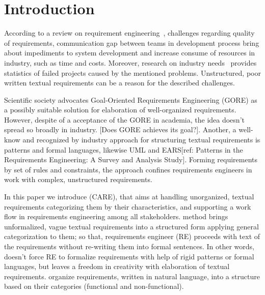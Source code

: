 \section{Introduction}
\label{sec:intro} 


According to a review on requirement engineering~\cite{1Review}, challenges regarding quality of requirements, communication gap between teams in development process bring about impediments to system development and increase consume of resources in industry, such as time and costs. Moreover, research on industry needs~\cite{16NaPiRe} provides statistics of failed projects caused by the mentioned problems. Unstructured, poor written textual requirements can be a reason for the described challenges.

Scientific society advocates Goal-Oriented Requirements Engineering (GORE) as a possibly suitable solution for elaboration of well-organized requirements. However, despite of a acceptance of the GORE in academia, the idea doesn't spread so broadly in industry. [Does GORE achieves its goal?]. Another, a well-know and recognized by industry approach for structuring textual requirements is patterns and formal languages, likewise UML and EARS[ref: Patterns in the Requirements Engineering: A Survey and Analysis Study]. Forming requirements by set of rules and constraints, the approach confines requirements engineers in work with complex, unstructured requirements.

In this paper we introduce \care (CARE), that aims at handling unorganized, textual requirements categorizing them by their characteristics, and supporting a work flow in requirements engineering among all stakeholders. \ca method brings unformalized, vague textual requirements into 
a structured form applying general categorization to them; so that, requirements engineer (RE) 
proceeds with text of the requirements without re-writing them into formal sentences. 
In other words, \ca doesn't force RE to formalize requirements with help of rigid patterns or 
formal languages, but leaves a freedom in creativity with elaboration of textual requirements. 
\ca organize requirements, written in natural language, into a structure based on their categories 
(functional and non-functional).

